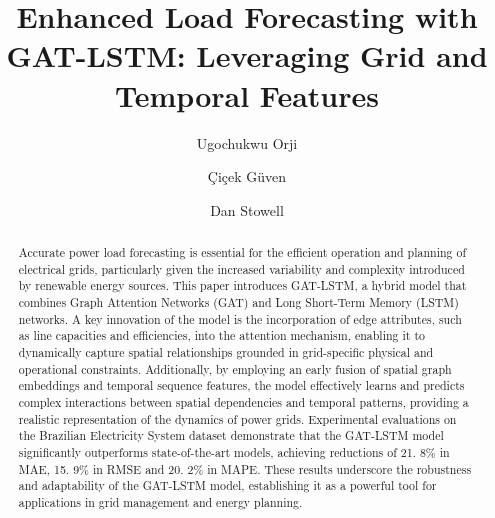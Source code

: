 \documentclass[sigconf,nonacm]{acmart}
\begin{document}
\title{Enhanced Load Forecasting with GAT-LSTM: Leveraging Grid and Temporal Features}


\author{Ugochukwu Orji}

\author{\c{C}i\c{c}ek G\"uven}

\author{Dan Stowell}


\renewcommand{\shortauthors}{Orji et al.}

\begin{abstract}
Accurate power load forecasting is essential for the efficient operation and planning of electrical grids, particularly given the increased variability and complexity introduced by renewable energy sources. This paper introduces GAT-LSTM, a hybrid model that combines Graph Attention Networks (GAT) and Long Short-Term Memory (LSTM) networks. A key innovation of the model is the incorporation of edge attributes, such as line capacities and efficiencies, into the attention mechanism, enabling it to dynamically capture spatial relationships grounded in grid-specific physical and operational constraints. Additionally, by employing an early fusion of spatial graph embeddings and temporal sequence features, the model effectively learns and predicts complex interactions between spatial dependencies and temporal patterns, providing a realistic representation of the dynamics of power grids. Experimental evaluations on the Brazilian Electricity System dataset demonstrate that the GAT-LSTM model significantly outperforms state-of-the-art models, achieving reductions of 21. 8\% in MAE, 15. 9\% in RMSE and 20. 2\% in MAPE. These results underscore the robustness and adaptability of the GAT-LSTM model, establishing it as a powerful tool for applications in grid management and energy planning.
\end{abstract}
\end{document}
